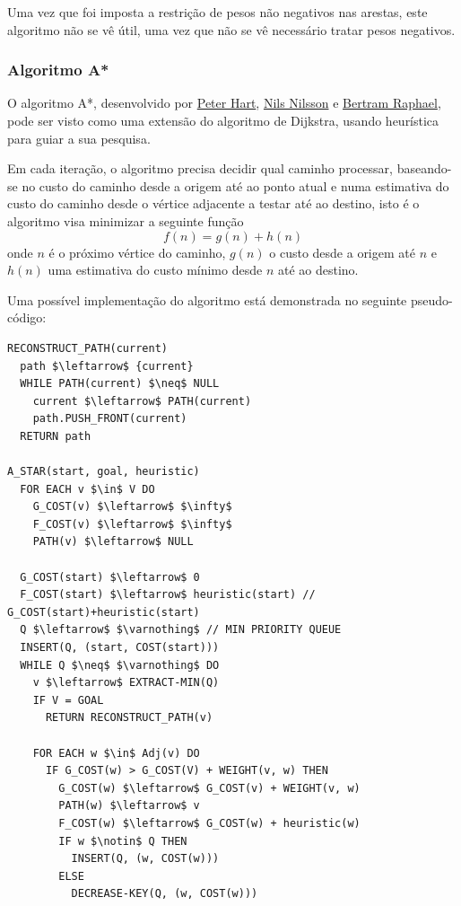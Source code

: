 \documentclass[article, a4paper, 12pt, oneside]{memoir}
\begin{document}
Uma vez que foi imposta a restrição de pesos não negativos nas arestas, este algoritmo não se vê útil, uma vez que não se vê necessário tratar pesos negativos.

\subsubsection{Algoritmo A*}
O algoritmo A*, desenvolvido por \href{https://en.wikipedia.org/wiki/Peter_E._Hart}{Peter Hart}, \href{https://en.wikipedia.org/wiki/Nils_John_Nilsson}{Nils Nilsson} e \href{https://en.wikipedia.org/wiki/Bertram_Raphael}{Bertram Raphael}, pode ser visto como uma extensão do algoritmo de Dijkstra, usando heurística para guiar a sua pesquisa.

Em cada iteração, o algoritmo precisa decidir qual caminho processar, baseando-se no custo  do caminho desde a origem até ao ponto atual e numa estimativa do custo do caminho desde o vértice adjacente a testar até ao destino, isto é o algoritmo visa minimizar a seguinte função
\begin{equation}
f(n) = g(n) + h(n)
\end{equation}
onde $n$ é o próximo vértice do caminho, $g(n)$ o custo desde a origem até $n$ e $h(n)$ uma estimativa do custo mínimo desde $n$ até ao destino.

Uma possível implementação do algoritmo está demonstrada no seguinte pseudo-código:
\begin{lstlisting}[frame=single, mathescape=true]
RECONSTRUCT_PATH(current)
  path $\leftarrow$ {current}
  WHILE PATH(current) $\neq$ NULL
    current $\leftarrow$ PATH(current)
    path.PUSH_FRONT(current)
  RETURN path

A_STAR(start, goal, heuristic)
  FOR EACH v $\in$ V DO
    G_COST(v) $\leftarrow$ $\infty$
    F_COST(v) $\leftarrow$ $\infty$
    PATH(v) $\leftarrow$ NULL

  G_COST(start) $\leftarrow$ 0
  F_COST(start) $\leftarrow$ heuristic(start) // G_COST(start)+heuristic(start)
  Q $\leftarrow$ $\varnothing$ // MIN PRIORITY QUEUE
  INSERT(Q, (start, COST(start)))
  WHILE Q $\neq$ $\varnothing$ DO
    v $\leftarrow$ EXTRACT-MIN(Q)	
    IF V = GOAL
      RETURN RECONSTRUCT_PATH(v)
    
    FOR EACH w $\in$ Adj(v) DO
      IF G_COST(w) > G_COST(V) + WEIGHT(v, w) THEN
        G_COST(w) $\leftarrow$ G_COST(v) + WEIGHT(v, w)
        PATH(w) $\leftarrow$ v
        F_COST(w) $\leftarrow$ G_COST(w) + heuristic(w)
        IF w $\notin$ Q THEN
          INSERT(Q, (w, COST(w)))
        ELSE
          DECREASE-KEY(Q, (w, COST(w)))
\end{lstlisting}
\end{document}
